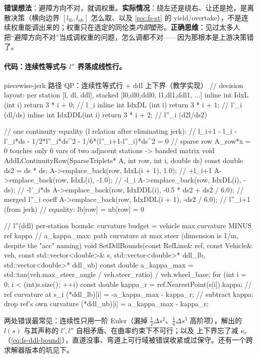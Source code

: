 \begin{pitfall}
\textbf{错误想法}：避障方向不对，就调权重。\textbf{实际情况}：绕左还是绕右、让还是抢，是离散决策（横向边界 $[l_{\mathrm{lb}},l_{\mathrm{ub}}]$ 怎么取、以及 \cref{sec:fs-st} 的 yield/overtake），不是连续权重能调出来的；权重只在选定的同伦类\emph{内部}塑形。\textbf{正确思维}：见过太多人把“避障方向不对”当成调权重的问题，怎么调都不对——因为那根本是上游决策错了。
\end{pitfall}

\paragraph{代码：连续性等式与 $l''$ 界落成线性行。}
\begin{codebox}[C++]{piecewise-jerk 路径 QP：连续性等式行 + ddl 上下界（教学实现）}
// decision layout: per station [l, dl, ddl], stacked [l0,dl0,ddl0, l1,dl1,ddl1, ...]
inline int IdxL  (int i) { return 3 * i + 0; }  // l_i
inline int IdxDL (int i) { return 3 * i + 1; }  // l'_i  (dl/ds)
inline int IdxDDL(int i) { return 3 * i + 2; }  // l''_i (d2l/ds2)

// one continuity equality (l relation after eliminating jerk):
//   l_{i+1} - l_i - l'_i*ds - 1/2*l''_i*ds^2 - 1/6*(l''_{i+1}-l''_i)*ds^2 = 0
// sparse row A_row*x = 0 touches only 6 vars of two adjacent stations -> banded matrix
void AddLContinuityRow(SparseTriplets* A, int row, int i, double ds) {
  const double ds2 = ds * ds;
  A->emplace_back(row, IdxL(i + 1),    1.0);                    // +l_{i+1}
  A->emplace_back(row, IdxL(i),       -1.0);                    // -l_i
  A->emplace_back(row, IdxDL(i),      -ds);                     // -l'_i*ds
  A->emplace_back(row, IdxDDL(i),     -0.5 * ds2 + ds2 / 6.0);  // merged l''_i coeff
  A->emplace_back(row, IdxDDL(i + 1), -ds2 / 6.0);              // l''_{i+1} (from jerk)
  // equality: lb[row] = ub[row] = 0
}

// l''(ddl) per-station bounds: curvature budget = vehicle max curvature MINUS ref kappa
// a_kappa_max: path curvature at max steer (dimension is 1/m, despite the "acc" naming)
void SetDdlBounds(const RefLine& ref, const Vehicle& veh, const std::vector<double>& s,
                  std::vector<double>* ddl_lb, std::vector<double>* ddl_ub) {
  const double a_kappa_max =
      std::tan(veh.max_steer_angle / veh.steer_ratio) / veh.wheel_base;
  for (int i = 0; i < (int)s.size(); ++i) {
    const double kappa_r = ref.NearestPoint(s[i]).kappa;        // ref curvature at s_i
    (*ddl_lb)[i] = -a_kappa_max - kappa_r;   // subtract kappa: drop ref's own curvature
    (*ddl_ub)[i] =  a_kappa_max - kappa_r;
  }
}
\end{codebox}
两处错误最常见：连续性只用一阶 Euler（漏掉 $\tfrac12\Delta s^2$、$\tfrac16\Delta s^3$ 高阶项），解出的 $l(s)$ 与其声称的 $l',l''$ 自相矛盾、在曲率约束下不可行；以及 \verb@ddl@ 上下界忘了减 $\kappa_r$（\cref{eq:fs-ddl-bound}），直道没事、弯道上可行域被错误收紧或过保守。还有一个跨求解器版本的坑见下。

